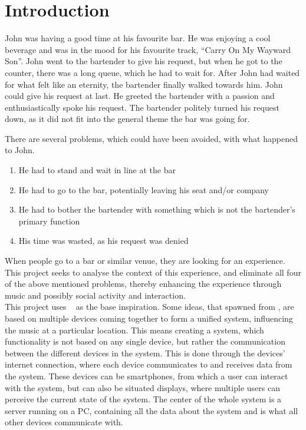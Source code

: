 \chapter{Introduction}\label{introduction}
John was having a good time at his favourite bar. He was enjoying a cool beverage and was in the mood for his favourite track, \enquote{Carry On My Wayward Son}. John went to the bartender to give his request, but when he got to the counter, there was a long queue, which he had to wait for. After John had waited for what felt like an eternity, the bartender finally walked towards him. John could give his request at last. He greeted the bartender with a passion and enthusiastically spoke his request. The bartender politely turned his request down, as it did not fit into the general theme the bar was going for.

There are several problems, which could have been avoided, with what
happened to John.

\begin{enumerate}
	\item He had to stand and wait in line at the bar
	\item He had to go to the bar, potentially leaving his seat and/or
company
	\item He had to bother the bartender with something which is not the bartender's primary function
	\item His time was wasted, as his request was denied
\end{enumerate}

When people go to a bar or similar venue, they are looking for an experience. This project seeks to analyse the context of this experience, and eliminate all four of the above mentioned problems, thereby enhancing the experience through music and possibly social activity and interaction.\\

This project uses ~\cite{sorensen2012} as the base inspiration.
Some ideas, that spawned from , are based on multiple devices coming together to form a unified system, influencing the music at a particular location. This means creating a system, which functionality is not based on any single device, but rather the communication between the different devices in the system.
This is done through the devices’ internet connection, where each device communicates to and receives data from the system. These devices can be smartphones, from which a user can interact with the system, but can also be situated displays, where multiple users can perceive the current state of the system. The center of the whole system is a server running on a PC, containing all the data about the system and is what all other devices communicate with.

